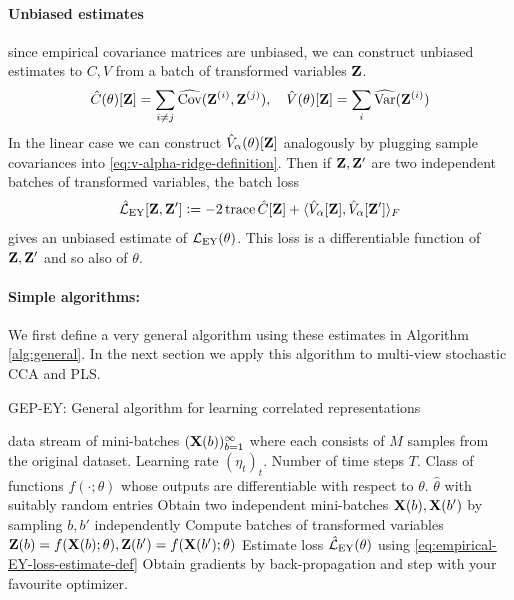 \paragraph{Unbiased estimates}
since empirical covariance matrices are unbiased, we can construct unbiased estimates to $C, V$ from a batch of transformed variables $\mathbf{Z}$.
\begin{align}\label{eq:def-C-V-matrices-empirical}
\hat{C}(\theta)[\mathbf{Z}] = \sum_{i \neq j} \widehat{\mathrm{Cov}}(\mathbf{Z}^{(i)}, \mathbf{Z}^{(j)}), \quad
\hat{V}(\theta)[\mathbf{Z}] = \sum_{i} \widehat{\mathrm{Var}}(\mathbf{Z}^{(i)})
\end{align}
In the linear case we can construct $\hat{V}_\alpha(\theta)[\mathbf{Z}]$ analogously by plugging sample covariances into \cref{eq:v-alpha-ridge-definition}.
Then if $\mathbf{Z}, \mathbf{Z}'$ are two independent batches of transformed variables, the batch loss
\begin{align}\label{eq:empirical-EY-loss-estimate-def}
\hat{\mathcal{L}}_\text{EY}[\mathbf{Z}, \mathbf{Z}'] \vcentcolon= - 2 \operatorname{trace} \hat{C}[\mathbf{Z}] + \langle \hat{V}_\alpha[\mathbf{Z}], \hat{V}_\alpha[\mathbf{Z}'] \rangle_F
\end{align}
gives an unbiased estimate of $\mathcal{L}_\text{EY}(\theta)$.
This loss is a differentiable function of $\mathbf{Z}, \mathbf{Z}'$ and so also of $\theta$.

\paragraph{Simple algorithms:}
We first define a very general algorithm using these estimates in Algorithm \ref{alg:general}.
In the next section we apply this algorithm to multi-view stochastic CCA and PLS.

\begin{algorithm}
    \caption{GEP-EY: General algorithm for learning correlated representations}
    \label{alg:general}
    \begin{algorithmic}
         data stream of mini-batches $(\mathbf{X}(b))_{b=1}^\infty$ where each consists of $M$ samples from the original dataset. Learning rate $(\eta_t)_t$. Number of time steps $T$. Class of functions $f(\cdot; \theta)$ whose outputs are differentiable with respect to $\theta$.
         $\hat{\theta}$ with suitably random entries
        \STATE Obtain two independent mini-batches \( \mathbf{X}(b), \mathbf{X}(b') \) by sampling \( b, b' \) independently
        \STATE Compute batches of transformed variables $\mathbf{Z}(b) = f(\mathbf{X}(b); \theta), \mathbf{Z}(b') = f(\mathbf{X}(b'); \theta)$
        \STATE Estimate loss $\hat{\mathcal{L}}_\text{EY}(\theta)$ using \cref{eq:empirical-EY-loss-estimate-def}
        \STATE Obtain gradients by back-propagation and step with your favourite optimizer.
        \ENDFOR
    \end{algorithmic}
\end{algorithm}

